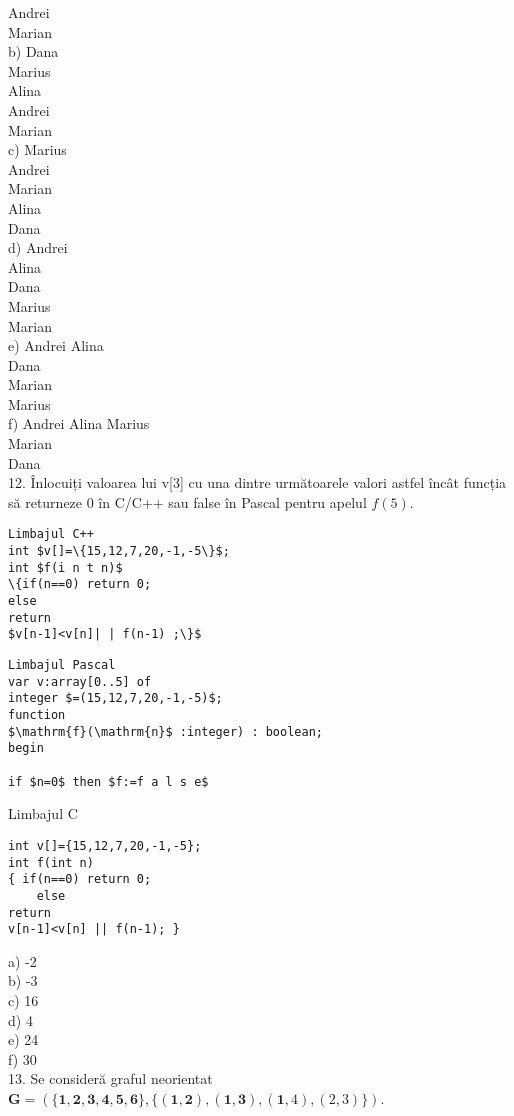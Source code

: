 Andrei\\
Marian\\
b) Dana\\
Marius\\
Alina\\
Andrei\\
Marian\\
c) Marius\\
Andrei\\
Marian\\
Alina\\
Dana\\
d) Andrei\\
Alina\\
Dana\\
Marius\\
Marian\\
e) Andrei Alina\\
Dana\\
Marian\\
Marius\\
f) Andrei Alina Marius\\
Marian\\
Dana\\[0pt]
12. Înlocuiți valoarea lui v[3] cu una dintre următoarele valori astfel încât funcția să returneze 0 în C/C++ sau false în Pascal pentru apelul $f(5)$.

\begin{verbatim}
Limbajul C++
int $v[]=\{15,12,7,20,-1,-5\}$;
int $f(i n t n)$
\{if(n==0) return 0;
else
return
$v[n-1]<v[n]| | f(n-1) ;\}$
\end{verbatim}

\begin{verbatim}
Limbajul Pascal
var v:array[0..5] of
integer $=(15,12,7,20,-1,-5)$;
function
$\mathrm{f}(\mathrm{n}$ :integer) : boolean;
begin

if $n=0$ then $f:=f a l s e$
\end{verbatim}

Limbajul C

\begin{verbatim}
int v[]={15,12,7,20,-1,-5};
int f(int n)
{ if(n==0) return 0;
    else
return
v[n-1]<v[n] || f(n-1); }
\end{verbatim}

a) -2\\
b) -3\\
c) 16\\
d) 4\\
e) 24\\
f) 30\\
13. Se consideră graful neorientat $\mathbf{G}=(\{\mathbf{1 , 2 , 3 , 4 , 5 , 6 \}},\{(\mathbf{1 , 2}),(\mathbf{1}, \mathbf{3}),(\mathbf{1}, 4),(2,3)\})$.

